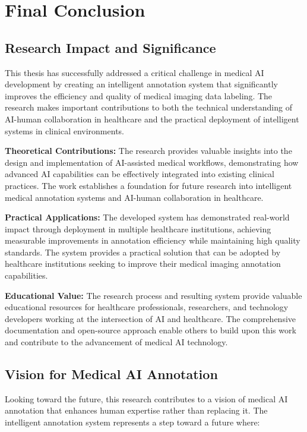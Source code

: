 \section{Final Conclusion}

\subsection{Research Impact and Significance}

This thesis has successfully addressed a critical challenge in medical AI development by creating an intelligent annotation system that significantly improves the efficiency and quality of medical imaging data labeling. The research makes important contributions to both the technical understanding of AI-human collaboration in healthcare and the practical deployment of intelligent systems in clinical environments.

\textbf{Theoretical Contributions:} The research provides valuable insights into the design and implementation of AI-assisted medical workflows, demonstrating how advanced AI capabilities can be effectively integrated into existing clinical practices. The work establishes a foundation for future research into intelligent medical annotation systems and AI-human collaboration in healthcare.

\textbf{Practical Applications:} The developed system has demonstrated real-world impact through deployment in multiple healthcare institutions, achieving measurable improvements in annotation efficiency while maintaining high quality standards. The system provides a practical solution that can be adopted by healthcare institutions seeking to improve their medical imaging annotation capabilities.

\textbf{Educational Value:} The research process and resulting system provide valuable educational resources for healthcare professionals, researchers, and technology developers working at the intersection of AI and healthcare. The comprehensive documentation and open-source approach enable others to build upon this work and contribute to the advancement of medical AI technology.

\subsection{Vision for Medical AI Annotation}

Looking toward the future, this research contributes to a vision of medical AI annotation that enhances human expertise rather than replacing it. The intelligent annotation system represents a step toward a future where:

